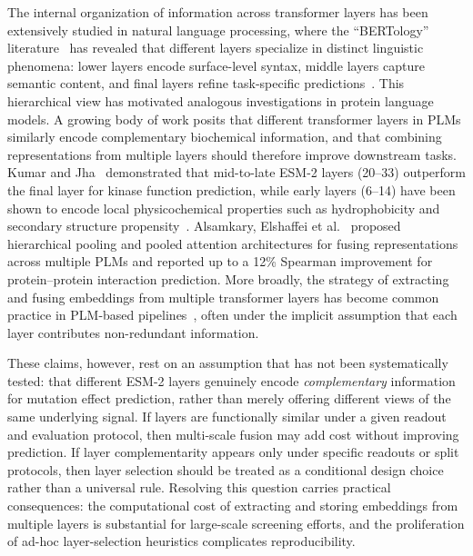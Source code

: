 \documentclass[11pt,a4paper]{article}
\newcommand{\revised}[1]{\textcolor{red}{#1}}
\begin{document}
The internal organization of information across transformer layers has been
extensively studied in natural language processing, where the ``BERTology''
literature~\cite{rogers2021bertology,tenney2019bert} has revealed that different layers specialize
in distinct linguistic phenomena: lower layers encode surface-level syntax, middle
layers capture semantic content, and final layers refine task-specific
predictions~\revised{\cite{tenney2019bert,rogers2021bertology}}.
This hierarchical view has motivated analogous investigations in protein language
models. A growing body of work posits that different transformer layers in PLMs
similarly encode complementary biochemical information, and that combining
representations from multiple layers should therefore improve downstream tasks.
Kumar and Jha~\cite{kumar2025} demonstrated that mid-to-late ESM-2 layers (20--33)
outperform the final layer for kinase function prediction, while early layers
(6--14) have been shown to encode local physicochemical properties such as
hydrophobicity and secondary structure propensity~\cite{detlefsen2022}.
Alsamkary, Elshaffei et al.~\cite{elshaffei2025} proposed hierarchical pooling and
pooled attention architectures for fusing representations across multiple PLMs and
reported up to a 12\% Spearman improvement for protein--protein interaction
prediction. More broadly, the strategy of extracting and fusing embeddings from
multiple transformer layers has become common practice in PLM-based
pipelines~\cite{rao2019tape}, often under the implicit assumption that each layer
contributes non-redundant information.

These claims, however, rest on an assumption that has not been systematically tested:
that different ESM-2 layers genuinely encode \emph{complementary} information for
mutation effect prediction, rather than merely offering different views of the same
underlying signal. If layers are functionally similar under a given readout and
evaluation protocol, then multi-scale fusion may add cost without improving prediction.
If layer complementarity appears only under specific readouts or split protocols,
then layer selection should be treated as a conditional design choice rather than
a universal rule. Resolving this question carries practical
consequences: the computational cost of extracting and storing embeddings from
multiple layers is substantial for large-scale screening efforts, and the
proliferation of ad-hoc layer-selection heuristics complicates reproducibility.
\end{document}
